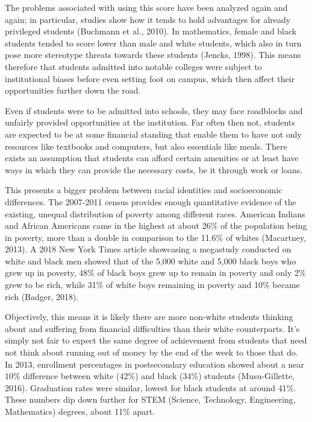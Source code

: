 The problems associated with using this score have been analyzed again and again; in particular, studies show how it tends to hold advantages for already privileged students (Buchmann et al., 2010). In mathematics, female and black students tended to score lower than male and white students, which also in turn pose more stereotype threats towards these students (Jencks, 1998). This means therefore that students admitted into notable colleges were subject to institutional biases before even setting foot on campus, which then affect their opportunities further down the road.

Even if students were to be admitted into schools, they may face roadblocks and unfairly provided opportunities at the institution. Far often then not, students are expected to be at some financial standing that enable them to have not only resources like textbooks and computers, but also essentials like meals. There exists an assumption that students can afford certain amenities or at least have ways in which they can provide the necessary costs, be it through work or loans.

This presents a bigger problem between racial identities and socioeconomic differences. The 2007-2011 census provides enough quantitative evidence of the existing, unequal distribution of poverty among different races. American Indians and African Americans came in the highest at about 26\% of the population being in poverty, more than a double in comparison to the 11.6\% of whites (Macartney, 2013). A 2018 New York Times article showcasing a megastudy conducted on white and black men showed that of the 5,000 white and 5,000 black boys who grew up in poverty, 48\% of black boys grew up to remain in poverty and only 2\% grew to be rich, while 31\% of white boys remaining in poverty and 10\% became rich (Badger, 2018).

Objectively, this means it is likely there are more non-white students thinking about and suffering from financial difficulties than their white counterparts. It's simply not fair to expect the same degree of achievement from students that need not think about running out of money by the end of the week to those that do. In 2013, enrollment percentages in postsecondary education showed about a near 10\% difference between white (42\%) and black (34\%) students (Musu-Gillette, 2016). Graduation rates were similar, lowest for black students at around 41\%. These numbers dip down further for STEM (Science, Technology, Engineering, Mathematics) degrees, about 11\% apart.

